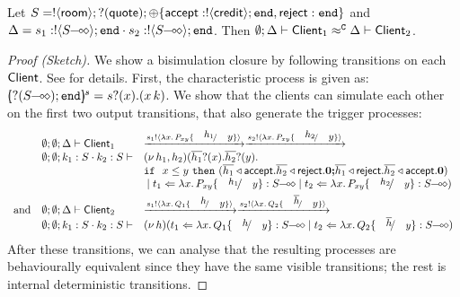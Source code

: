 \documentclass[a4paper,UKenglish]{lipics}
\theoremstyle{definition}
\begin{document}
\begin{proposition}\label{p:examp}
	Let
	$S = ! \langle \mathsf{room} \rangle ; ? (\mathsf{quote}) ; \oplus \{\mathsf{accept}: ! \langle \mathsf{credit} \rangle ; \mathtt{end}, \mathsf{reject}: \mathtt{end}\}$ and 
$\Delta = s_1: \btout{\lhot{S}} \tinact \cat s_2: \btout{\lhot{S}} \tinact$. 
Then
	$ \emptyset; \Delta \vdash \mathsf{Client}_1 \approx^\mathtt{C} \Delta \vdash \mathsf{Client}_2$. %
\vspace{-2mm}
\end{proposition}
\begin{proof}[Proof (Sketch)]
	\noi We show a bisimulation closure by following transitions on each $\mathsf{Client}$.
	See  for details.
	First, the characteristic process is given as:
	$\mapchar{\btinp{\lhot{S}} \tinact}{s} = \binp{s}{x} (\appl{x}{k})$.
We show that the clients can simulate each other on
the first two output transitions, that also generate the trigger
processes:
%
\[
	\begin{array}{lll}
&	\es; \es; \Delta \proves \Client_1
	&
		\by{\bactout{s_1}{\abs{x}{P_{xy} \subst{h_1}{y}}}}
		\by{\bactout{s_2}{\abs{x}{P_{xy} \subst{h_2}{y}}}}
		\\
&		\es; \es; k_1: S \cat k_2: S \proves
		&
		\newsp{h_1, h_2}{\binp{\dual{h_1}}{x} \binp{\dual{h_2}}{y}\\
&		& \If\ x \leq y\ \Then (\bsel{\dual{h_1}}{\accept} \bsel{\dual{h_2}}{\reject} \inact
		\Else \bsel{\dual{h_1}}{\reject} \bsel{\dual{h_2}}{\accept} \inact)\\
&		& \Par \ftrigger{t_1}{\abs{x}{P_{xy} \subst{h_1}{y}}}{\lhot{S}} \Par \ftrigger{t_2}{\abs{x}{P_{xy} \subst{h_2}{y}}}{\lhot{S}}}
		\\[1mm]
\mbox{and} &
		\es; \es; \Delta \proves \Client_2
		&\by{\bactout{s_1}{\abs{x}{Q_1 \subst{h}{y}}}}
		\by{\bactout{s_2}{\abs{x}{Q_2 \subst{\dual{h}}{y}}}}
		\\
&		\es; \es; k_1: S \cat k_2: S \proves & \newsp{h}{
		\ftrigger{t_1}{\abs{x}{Q_1 \subst{h}{y}}}{\lhot{S}} \Par \ftrigger{t_2}{\abs{x}{Q_2 \subst{\dual{h}}{y}}}{\lhot{S}}}
	\end{array}
\]
	\noi 
After these transitions, 
we can analyse that 
the resulting processes are behaviourally equivalent
since they have the same visible transitions; the rest 
is internal deterministic transitions. 
\end{proof}
\end{document}
